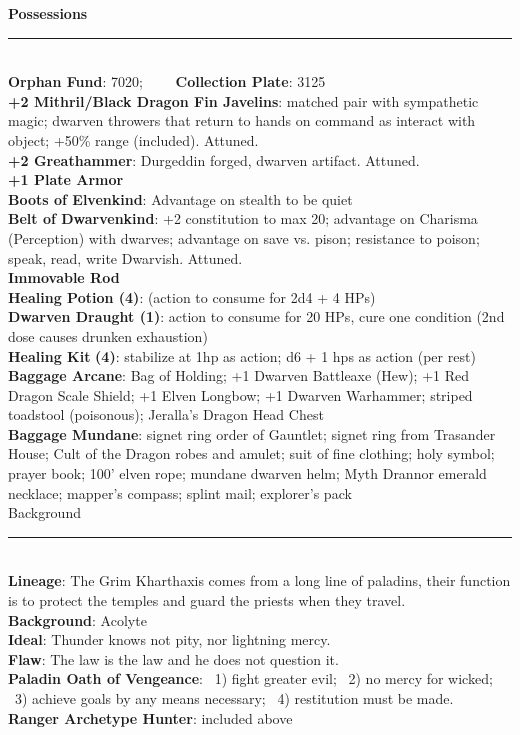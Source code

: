 \documentclass[11pt]{article}
\newcommand{\heading}[1]{{\sc\bfseries #1}}
\begin{document}
{\noindent
{\sc\bfseries\Large Possessions}
\vspace*{4pt}
\hrule
\mbox{ } \\[4pt]
\noindent
\heading{Orphan Fund}: 7020;  \ \ \ \ \heading{Collection Plate}: 3125
\\[4pt]
\heading{+2 Mithril/Black Dragon Fin Javelins}: matched pair with sympathetic magic;  dwarven throwers that return to hands on command as interact with object;  +50\% range (included).  Attuned.
\\[4pt]
\heading{+2 Greathammer}: Durgeddin forged, dwarven artifact.  Attuned.
\\[4pt]
\heading{+1 Plate Armor}
\\[8pt]
\heading{Boots of Elvenkind}: Advantage on stealth to be quiet
\\[4pt]
\heading{Belt of Dwarvenkind}: +2 constitution to max 20; advantage on Charisma (Perception) with dwarves; advantage on save vs. pison; resistance to poison; speak, read, write Dwarvish.  Attuned.
\\[4pt]
\heading{Immovable Rod}
\\[8pt]
\heading{Healing Potion {\bf (4)}}: (action to consume for 2d4 + 4 HPs)
\\[4pt]
\heading{Dwarven Draught {\bf (1)}}: action to consume for 20 HPs, cure one condition (2nd dose causes drunken exhaustion)
\\[8pt]
\heading{Healing Kit} {\bf (4)}: stabilize at 1hp as action;  d6 + 1 hps as action (per rest)
\\[8pt]
\heading{Baggage Arcane}: Bag of Holding; +1 Dwarven Battleaxe (Hew); +1 Red Dragon Scale Shield; +1 Elven Longbow;  +1 Dwarven Warhammer; striped toadstool (poisonous); Jeralla's Dragon Head Chest
\\[4pt]
\heading{Baggage Mundane}: signet ring order of Gauntlet; signet ring from Trasander House;  Cult of the Dragon robes and amulet; suit of fine clothing; holy symbol; prayer book; 100' elven rope; mundane dwarven helm;  Myth Drannor emerald necklace; mapper's compass; splint mail; explorer's pack
\\[12pt]


\noindent
{\LARGE Background}
\hrule

\mbox{ }
\\[8pt]
%
\heading{Lineage}: The Grim Kharthaxis comes from a long line of paladins, their function is to protect the temples and guard the priests when they travel.
\\[4pt]
%
\heading{Background}: Acolyte
\\[4pt]
\heading{Ideal}:  Thunder knows not pity, nor lightning mercy.
\\[4pt]
%
\heading{Flaw}:  The law is the law and he does not question it.
\\[4pt]
%
\heading{Paladin Oath of Vengeance}:
\ 1) fight greater evil;
\ 2) no mercy for wicked;
\ 3) achieve goals by any means necessary;
\ 4) restitution must be made.
\\[4pt]
%
\heading{Ranger Archetype Hunter}: included above

}
\end{document}
